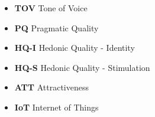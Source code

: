 \begin{itemize}[label={}]
    \item \textbf{TOV} \hspace{2mm} Tone of Voice
    \item \textbf{PQ} \hspace{2mm} Pragmatic Quality
    \item \textbf{HQ-I} \hspace{2mm} Hedonic Quality - Identity
    \item \textbf{HQ-S}\hspace{2mm}  Hedonic Quality - Stimulation
    \item \textbf{ATT} \hspace{2mm} Attractiveness
    \item \textbf{IoT} \hspace{2mm} Internet of Things
\end{itemize}
